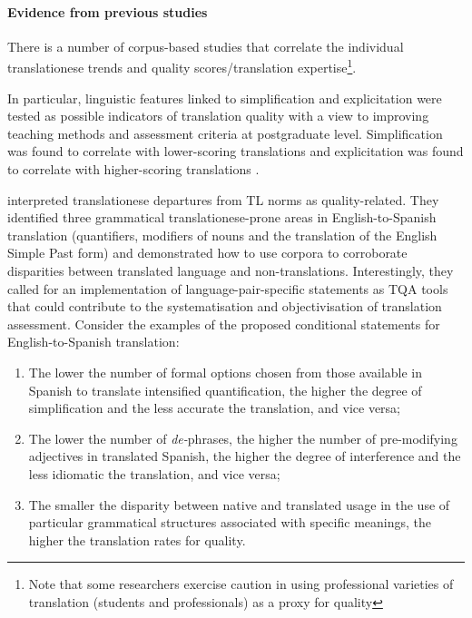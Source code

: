 \paragraph{Evidence from previous studies} There is a number of corpus-based studies that correlate the individual translationese trends and quality scores/translation expertise\footnote{Note that some researchers exercise caution in using professional varieties of translation (students and professionals) as a proxy for quality}.

In particular, linguistic features linked to simplification and explicitation were tested as possible indicators of translation quality with a view to improving teaching methods and assessment criteria at postgraduate level. Simplification was found to correlate with lower-scoring translations and explicitation was found to correlate with higher-scoring translations \cite{Scarpa2006}. 

\citet{Rabadan2009} interpreted translationese departures from TL norms as quality-related. They identified three grammatical translationese-prone areas in English-to-Spanish translation (quantifiers, modifiers of nouns and the translation of the English Simple Past form) and demonstrated how to use corpora to corroborate disparities between translated language and non-translations. %
Interestingly, they called for an implementation of language-pair-specific statements as \gls{TQA} tools that could contribute to the systematisation and objectivisation of translation assessment. Consider the examples of the proposed conditional statements for English-to-Spanish translation:

\begin{enumerate}\compresslist{}
	\item The lower the number of formal options chosen from those available in Spanish to translate intensified quantification, the higher the degree of simplification and the less accurate the translation, and vice versa;
	\item The lower the number of \textit{de-}phrases, the higher the number of pre-modifying adjectives in translated Spanish, the higher the degree of interference and the less idiomatic the translation, and vice versa;
	\item The smaller the disparity between native and translated usage in the use of particular grammatical structures associated with specific meanings, the higher the translation rates for quality.
\end{enumerate}

